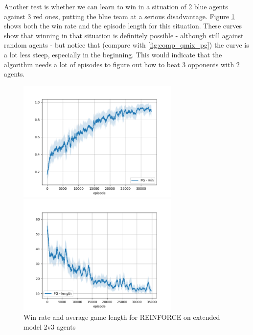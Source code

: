 Another test is whether we can learn to win in a situation of 2 blue agents against 3 red ones, putting the blue team at a serious disadvantage. Figure \ref{fig:pg_extended2} shows both the win rate and the episode length for this situation. These curves show that winning in that situation is definitely possible - although still against random agents - but notice that (compare with \ref{fig:comp_qmix_pg}) the curve is a lot less steep, especially in the beginning. This would indicate that the algorithm needs a lot of episodes to figure out how to beat $3$ opponents with $2$ agents.

\begin{figure}[htp]
\centering
\begin{minipage}{.45\textwidth}
  \centering
  \includegraphics[width=8cm]{images/experiment6/pg_win_2v3.png}
\end{minipage}%
\begin{minipage}{.05\textwidth}
\centering
  \caption*{ }
\end{minipage}%
\begin{minipage}{.45\textwidth}
  \centering
  \includegraphics[width=8cm]{images/experiment6/pg_length_2v3.png}
\end{minipage}
\caption{Win rate and average game length for REINFORCE on extended model 2v3 agents}
\label{fig:pg_extended2}
\end{figure}

